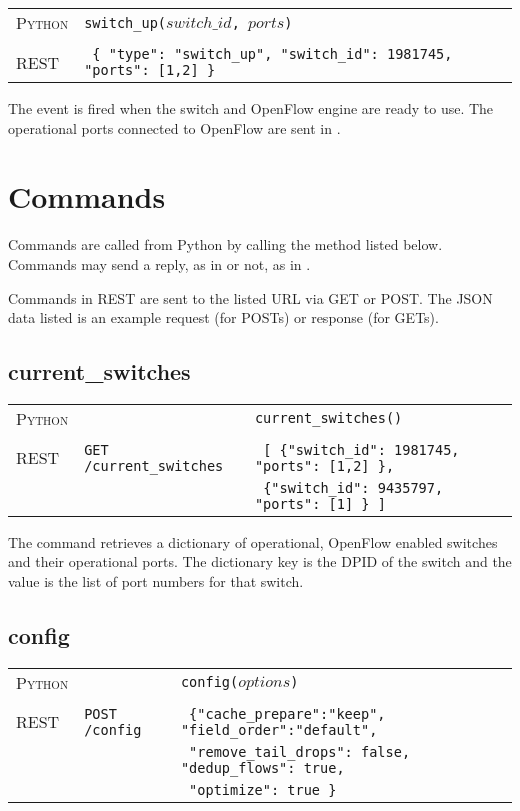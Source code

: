 \bigskip
\begin{tabularx}{\linewidth}{lX}
\textsc{Python}   & \texttt{switch\_up($switch\_id$, $ports$)} \\ \\
\textsc{REST} & \texttt{ \{ "type": "switch\_up", "switch\_id": 1981745, "ports": [1,2] \} } 
\end{tabularx}

The  event is fired when the switch and OpenFlow engine are ready to use.  The
operational ports connected to OpenFlow are sent in .  

\section{Commands}
\label{reference:commands}

Commands are called from Python by calling the method listed below.  Commands may send a reply, as in
 or not, as in .

Commands in REST are sent to the listed URL via GET or POST.  The JSON data listed is an example
request (for POSTs) or response (for GETs). 

\subsection{current\_switches}

\bigskip
\begin{tabularx}{\linewidth}{lXX}
\textsc{Python} &  & \texttt{current\_switches()} \\ \\
\textsc{REST} & \texttt{GET /current\_switches} & 
  \texttt{ [ \{"switch\_id": 1981745, "ports": [1,2] \}, } \\
  & & \texttt{ \{"switch\_id": 9435797, "ports": [1] \} ] } 
\end{tabularx}

The  command retrieves a dictionary of operational, OpenFlow enabled switches
and their operational ports.  The dictionary key is the DPID of the switch and the value is the
list of port numbers for that switch.    

\subsection{config}

\bigskip
\begin{tabularx}{\linewidth}{llX}
\textsc{Python} &  & \texttt{config($options$)} \\ \\
\textsc{REST} & \texttt{POST /config} & 
  \texttt{ \{"cache\_prepare":"keep", "field\_order":"default", } \\
  & & \texttt{ "remove\_tail\_drops": false, "dedup\_flows": true, } \\ 
  & & \texttt{ "optimize": true \} } \\ 
\end{tabularx}

